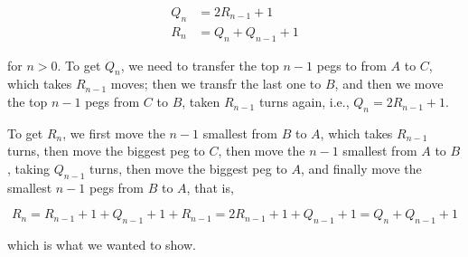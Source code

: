 \documentclass[a4paper]{article}
\begin{document}
\begin{align*}
    Q_n & = 2R_{n-1}+1 \\
    R_n & = Q_n + Q_{n-1} + 1
\end{align*}

for $n > 0$. To get $Q_n$, we need to transfer the top $n-1$ pegs to from $A$
to $C$, which takes $R_{n-1}$ moves; then we transfr the last one to $B$, and then 
we move the top $n-1$ pegs from $C$ to $B$, taken $R_{n-1}$ turns again, i.e., 
$Q_n = 2R_{n-1} + 1$. 

To get $R_n$, we first move the $n-1$ smallest from $B$ to $A$, which takes $R_{n-1}$ turns,
then move the biggest peg to $C$, then move the $n-1$ smallest from $A$ to $B$, taking 
$Q_{n-1}$ turns, then move the biggest peg to $A$, and finally move the smallest 
$n-1$ pegs from $B$ to $A$, that is,

\begin{equation*}
    R_n = R_{n-1} + 1 + Q_{n-1} + 1 + R_{n-1} = 2R_{n-1} + 1 + Q_{n-1} + 1 = Q_n + Q_{n-1} + 1
\end{equation*}

which is what we wanted to show. 
\end{document}
